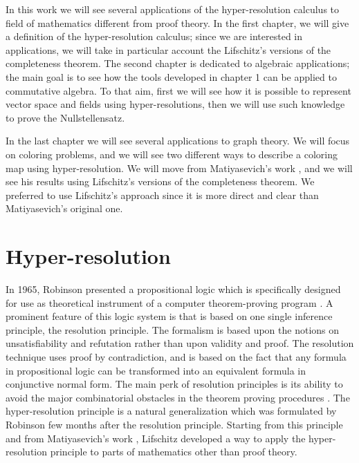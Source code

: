 \documentclass[a4paper,12pt,oneside]{book}
\begin{document}
In this work we will see several applications of the hyper-resolution calculus to field of mathematics different from proof theory. 
In the first chapter, we will give a definition of the hyper-resolution calculus; since we are interested in applications, we will take in particular account the Lifschitz's versions of the completeness theorem. The second chapter is dedicated to algebraic applications; the main goal is to see how the tools developed in chapter 1 can be applied to commutative algebra. To that aim, first we will see how it is possible to represent vector space and fields using hyper-resolutions, then we will use such knowledge to prove the Nullstellensatz. 

In the last chapter we will see several applications to graph theory. We will focus on coloring problems, and we will see two different ways to describe a coloring map using hyper-resolution. We will move from 
Matiyasevich's work \cite{mat-2,mat-3,mat-1}, and we will see his results using Lifschitz's versions of the completeness theorem.  We preferred to use Lifschitz's approach since it is more direct and clear than Matiyasevich's original one. 



\chapter{Hyper-resolution}
In 1965, Robinson presented a propositional logic which is specifically designed for use as theoretical instrument of a computer theorem-proving program \cite{robinson}. A prominent feature of this logic system is that is based on one single inference principle, the resolution principle. 
The formalism is based upon the notions on unsatisfiability and refutation rather than upon validity and proof. The resolution technique uses proof by contradiction, and is based on the fact that any formula in propositional logic can be transformed into an equivalent formula in conjunctive normal form. 
The main perk of resolution principles is its ability to avoid the major combinatorial obstacles in the theorem proving procedures  \cite{robinson}.
The hyper-resolution principle is a natural generalization which was formulated by Robinson \cite{rob,robinson-general} few months after the resolution principle. Starting from this principle and from Matiyasevich's work \cite{mat-1}, Lifschitz \cite{lifschitz} developed a way to apply the hyper-resolution principle to parts of mathematics other than proof theory.

\newpage
\end{document}
